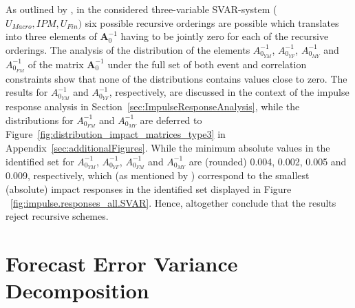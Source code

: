 \documentclass[a4paper,11pt,listof=nochaptergap,oneside,pointednumbers,bibtotoc,bigheadings,liststotoc,hidelinks]{scrbook}
\theoremstyle{mysatz}
\theoremstyle{mydefinition}
\theoremstyle{mytheorem}
\theoremstyle{mybemerkung}
\newcommand{\vect}[1]{\boldsymbol{\mathbf{#1}}}
\begin{document}
As outlined by \citet{ludvigsonetal:19}, in the considered three-variable SVAR-system ($U_{Macro}, IPM, U_{Fin})$ six possible recursive orderings are possible which translates into three elements of $\vect{A}_0^{-1}$ having to be jointly zero for each of the recursive orderings. The analysis of the distribution of the elements $A_{0_{YM}}^{-1}$, $A_{0_{YF}}^{-1}$, $A_{0_{MY}}^{-1}$ and $A_{0_{FM}}^{-1}$ of the matrix $\vect{A}_0^{-1}$ under the full set of both event and correlation constraints show that none of the distributions contains values close to zero. The results for $A_{0_{YM}}^{-1}$ and $A_{0_{YF}}^{-1}$, respectively, are discussed in the context of the impulse response analysis in Section~\ref{sec:ImpulseResponseAnalysis}, while the distributions for $A_{0_{FM}}^{-1}$ and $A_{0_{MY}}^{-1}$ are deferred to Figure~\ref{fig:distribution_impact_matrices_type3} in Appendix~\ref{sec:additionalFigures}. While the minimum absolute values in the identified set for $A_{0_{YM}}^{-1}$, $A_{0_{YF}}^{-1}$, $A_{0_{FM}}^{-1}$ and $A_{0_{MY}}^{-1}$ are (rounded) 0.004, 0.002, 0.005 and 0.009, respectively, which (as mentioned by \citealp{ludvigsonetal:19}) correspond to the smallest (absolute) impact responses in the identified set displayed in Figure ~\ref{fig:impulse.responses_all.SVAR}. Hence, altogether \citet{ludvigsonetal:19} conclude that the results reject recursive schemes.

\section[Forecast Error Variance Decomposition]{Forecast Error Variance Decomposition}
\label{sec:FEVD}
\end{document}
